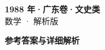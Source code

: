 \documentclass[zihao=-4, a4paper]{ctexart}
\begin{document}
\begin{center}
  {\Large\bfseries 1988 年·广东卷·文史类}\\[4pt]
  {\large 数学 · 解析版}
\end{center}
\medskip
{}

\clearpage
{}
\begin{center}{\Large\bfseries 参考答案与详细解析}\end{center}
\medskip

\end{document}
